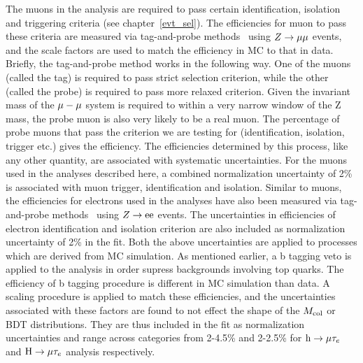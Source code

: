 The muons in the analysis are required to pass certain identification, isolation and triggering criteria (see chapter~\ref{evt_sel}). The efficiencies for muon to pass these criteria are measured via tag-and-probe methods~\cite{muon_recon2018} using $Z\rightarrow\mu\mu$ events, and the scale factors are used to match the efficiency in MC to that in data. Briefly, the tag-and-probe method works in the following way. One of the muons (called the tag) is required to pass strict selection criterion, while the other (called the probe) is required to pass more relaxed criterion. Given the invariant mass of the $\mu-\mu$ system is required to within a very narrow  window of the Z mass, the probe muon is also very likely to be a real muon. The percentage of probe muons that pass the criterion we are testing for (identification, isolation, trigger etc.) gives the  efficiency. The efficiencies determined by this process, like any other quantity, are associated with systematic  uncertainties. For the muons used in the analyses described here, a combined normalization uncertainty of 2\% is associated with muon trigger, identification and isolation. Similar to muons, the efficiencies for electrons used in the analyses have also been measured via tag-and-probe methods~\cite{e_recon} using $Z\rightarrow\text{e}\text{e}$ events. The uncertainties in efficiencies  of electron identification and isolation criterion are also included as normalization uncertainty of 2\% in the fit. Both the above uncertainties are applied to processes which are derived from MC simulation. As mentioned earlier, a b tagging veto is applied to the analysis in order supress backgrounds involving top quarks. The efficiency of b tagging procedure is different in MC simulation than data. A scaling procedure is applied to match these efficiencies, and the uncertainties associated with these factors are found to not effect the shape of the $M_{\text{col}}$ or BDT distributions. They are thus included in the fit as normalization uncertainties and range across categories from 2-4.5\% and 2-2.5\% for $\text{h} \to \mu \tau_{e}$ and $\text{H} \to \mu \tau_{e}$ analysis respectively.

